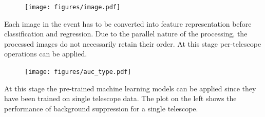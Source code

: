 \begin{multicols}{2}
\begin{center}
        \begin{streamblock}[equal height group=C, width=0.8\linewidth]{0mm}{-5mm}{}%
          \begin{multicols}{2}
            \begin{figure}
              \texttt{[image: figures/image.pdf]}
            \end{figure}

            \columnbreak
            Each image in the event has to be converted into feature representation before classification and regression.
            Due to the parallel nature of the processing, the processed images do not necessarily retain their order.
            At this stage per-telescope operations can be applied.

          \end{multicols}
        \end{streamblock}%

        \begin{streamblock}[equal height group=C, width=0.8\linewidth]{-5mm}{-5mm}{}%
          \begin{multicols}{2}
            \begin{figure}
              \texttt{[image: figures/auc\_type.pdf]}
            \end{figure}
            \columnbreak

            At this stage the pre-trained machine learning models can be applied since they
            have been trained on single telescope data. The plot on the left shows the performance
            of background suppression for a single telescope.

          \end{multicols}
        \end{streamblock}%



\end{center}
\end{multicols}

